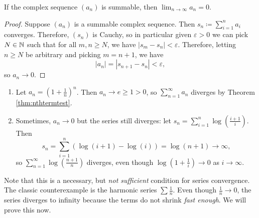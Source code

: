 \documentclass[../analysis1.tex]{subfiles}
\begin{document}
\begin{theorem}
\label{thm:nthtermtest}
    \begin{shaded*}
        If the complex sequence $(a_n)$ is summable, then $\lim_{n \to \infty} a_n = 0$.
    \end{shaded*}
\end{theorem}

\begin{proof}
    Suppose $(a_n)$ is a summable complex sequence. Then $s_n\coloneqq \sum_{i=1}^na_i$ converges. Therefore, $(s_n)$ is Cauchy, so in particular given $\varepsilon>0$ we can pick $N\in\mathbb{N}$ such that for all $m,n\ge N$, we have $|s_m-s_n|<\varepsilon.$ Therefore, letting $n\ge N$ be arbitrary and picking $m=n+1$, we have $$|a_n|=|s_{n+1}-s_n|<\varepsilon,$$so $a_n\to 0$.\qedhere
\end{proof}

\begin{example}
    \begin{enumerate}
        \item[1.] Let $a_n=\left(1+\frac{1}{n}\right)^n$. Then $a_n\to e \ge 1>0$, so $\sum_{n=1}^{\infty}a_n$ diverges by Theorem \ref{thm:nthtermtest}.
        \item[2.] Sometimes, $a_n\to 0$ but the series still diverges: let $s_n=\sum_{i=1}^n\log\left(\frac{i+1}{i}\right)$. Then $$s_n=\sum_{i=1}^n\left(\log(i+1)-\log(i)\right)=\log(n+1)\to\infty,$$so $\sum_{n=1}^{\infty}\log\left(\frac{n+1}{n}\right)$ diverges, even though $\log\left(1+\frac{1}{i}\right)\to 0$ as $i\to\infty$. 
    \end{enumerate}
    
\end{example}

\begin{remark}
    Note that this is a necessary, but \textit{not sufficient} condition for series convergence. The classic counterexample is the harmonic series $\sum \frac{1}{n}$. Even though $\frac{1}{n} \to 0$, the series diverges to infinity because the terms do not shrink \textit{fast enough}.
    We will prove this now.
\end{remark}
\end{document}
